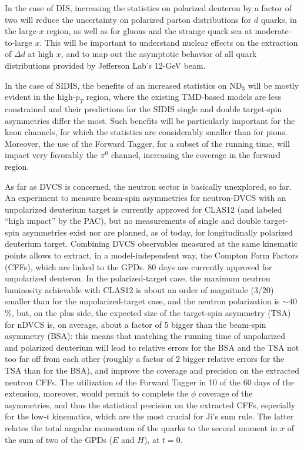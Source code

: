 In the case of DIS, increasing the statistics on polarized deuteron by a factor of two will reduce the uncertainty on polarized parton distributions for $d$ quarks, in the large-$x$ region, as well as for gluons and the strange quark sea at moderate-to-large $x$. This will be important to understand nuclear effects on the extraction of $\Delta d$ at high $x$, and to map out the asymptotic behavior of all quark distributions provided by Jefferson Lab's 12-GeV beam. 

In the case of SIDIS, the benefits of an increased statistics on ND$_3$ will be mostly evident in the high-$p_T$ region, where the existing TMD-based models are less constrained and their predictions for the SIDIS single and double target-spin asymmetries differ the most. Such benefits will be particularly important for the kaon channels, for which the statistics are considerably smaller than for pions. Moreover, the use of the Forward Tagger, for a subset of the running time, will impact very favorably the $\pi^0$ channel, increasing the coverage in the forward region. 

As far as DVCS is concerned, the neutron sector is basically unexplored, so far. An experiment to measure beam-spin asymmetries for neutron-DVCS with an unpolarized deuterium target is currently approved for CLAS12 (and labeled ``high impact'' by the PAC), but no measurements of single and double target-spin asymmetries exist nor are planned, as of today, for longitudinally polarized deuterium target. Combining DVCS observables measured at the same kinematic points allows to extract, in a model-independent way, the Compton Form Factors (CFFs), which are linked to the GPDs. 80 days are currently approved for unpolarized deuteron. In the polarized-target case, the maximum neutron luminosity achievable with CLAS12 is about an order of magnitude (3/20) smaller than for the unpolarized-target case, and the neutron polarization is $\sim 40$\%, but, on the plus side, the expected size of the target-spin asymmetry (TSA) for nDVCS is, on average, about a factor of 5 bigger than the beam-spin asymmetry (BSA): this means that matching the running time of unpolarized and polarized deuterium will lead to relative errors for the BSA and the TSA not too far off from each other (roughly a factor of 2 bigger relative errors for the TSA than for the BSA), and improve the coverage and precision on the extracted neutron CFFs. The utilization of the Forward Tagger in 10 of the 60 days of the extension, moreover, would permit to complete the $\phi$ coverage of the asymmetries, and thus the statistical precision on the extracted CFFs, especially for the low-$t$ kinematics, which are the most crucial for Ji's sum rule. The latter relates the total angular momentum of the quarks to the second moment in $x$ of the sum of two of the GPDs ($E$ and $H$), at $t=0$.

